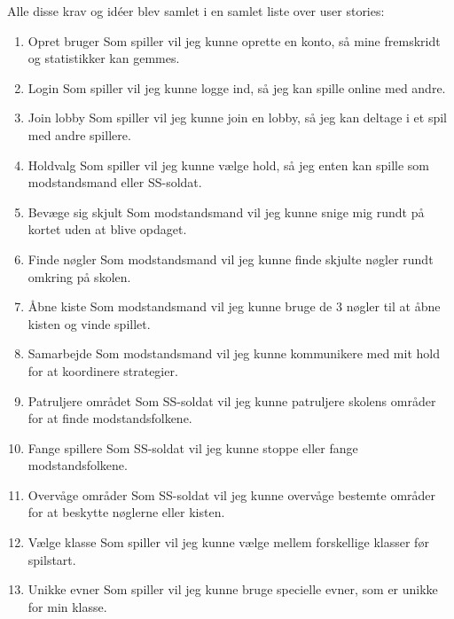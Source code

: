 Alle disse krav og idéer blev samlet i en samlet liste over user stories:
\begin{enumerate}
    \item Opret bruger  
    Som spiller vil jeg kunne oprette en konto, så mine fremskridt og statistikker kan gemmes.

    \item Login  
    Som spiller vil jeg kunne logge ind, så jeg kan spille online med andre.

    \item Join lobby  
    Som spiller vil jeg kunne join en lobby, så jeg kan deltage i et spil med andre spillere.

    \item Holdvalg  
    Som spiller vil jeg kunne vælge hold, så jeg enten kan spille som modstandsmand eller SS-soldat.

    \item Bevæge sig skjult  
    Som modstandsmand vil jeg kunne snige mig rundt på kortet uden at blive opdaget.

    \item Finde nøgler  
    Som modstandsmand vil jeg kunne finde skjulte nøgler rundt omkring på skolen.

    \item Åbne kiste  
    Som modstandsmand vil jeg kunne bruge de 3 nøgler til at åbne kisten og vinde spillet.

    \item Samarbejde  
    Som modstandsmand vil jeg kunne kommunikere med mit hold for at koordinere strategier.

    \item Patruljere området  
    Som SS-soldat vil jeg kunne patruljere skolens områder for at finde modstandsfolkene.

    \item Fange spillere  
    Som SS-soldat vil jeg kunne stoppe eller fange modstandsfolkene.

    \item Overvåge områder  
    Som SS-soldat vil jeg kunne overvåge bestemte områder for at beskytte nøglerne eller kisten.

    \item Vælge klasse  
    Som spiller vil jeg kunne vælge mellem forskellige klasser før spilstart.

    \item Unikke evner  
    Som spiller vil jeg kunne bruge specielle evner, som er unikke for min klasse.


\end{enumerate}
